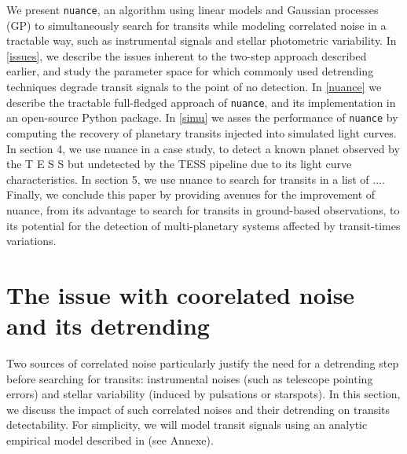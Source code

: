 \documentclass{aastex631}
\begin{document}
We present \texttt{nuance}, an algorithm using linear models and Gaussian processes (GP) to simultaneously search for transits while modeling correlated noise in a tractable way, such as instrumental signals and stellar photometric variability. In \autoref{issues}, we describe the issues inherent to the two-step approach described earlier, and study the parameter space for which commonly used detrending techniques degrade transit signals to the point of no detection. In \autoref{nuance} we describe the tractable full-fledged approach of \texttt{nuance}, and its implementation in an open-source Python package. In \autoref{simu} we asses the performance of \texttt{nuance} by computing the recovery of planetary transits injected into simulated light curves. In section 4, we use nuance in a case study, to detect a known planet observed by the T E S S but undetected by the TESS pipeline due to its light curve characteristics. In section 5, we use nuance to search for transits in a list of .... Finally, we conclude this paper by providing avenues for the improvement of nuance, from its advantage to search for transits in ground-based observations, to its potential for the detection of multi-planetary systems affected by transit-times variations.

\newpage
\section{The issue with coorelated noise and its detrending}\label{issues}
Two sources of correlated noise particularly justify the need for a detrending step before searching for transits: instrumental noises (such as telescope pointing errors) and stellar variability (induced by  pulsations or starspots). In this section, we discuss the impact of such correlated noises and their detrending on transits detectability. For simplicity, we will model transit signals using an analytic empirical model described in \citealt{protopapas} (see Annexe).\\ 
\end{document}
